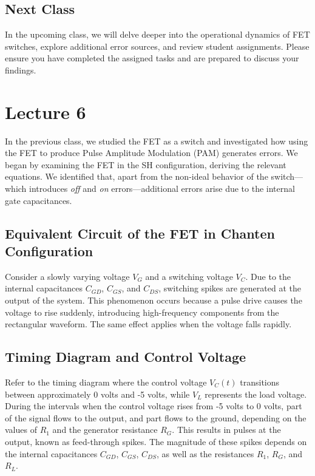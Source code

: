 \subsection*{Next Class}
In the upcoming class, we will delve deeper into the operational dynamics of FET switches, explore additional error sources, and review student assignments. Please ensure you have completed the assigned tasks and are prepared to discuss your findings.

\newpage
\section{Lecture 6}

In the previous class, we studied the FET as a switch and investigated how using the FET to produce Pulse Amplitude Modulation (PAM) generates errors. We began by examining the FET in the SH configuration, deriving the relevant equations. We identified that, apart from the non-ideal behavior of the switch—which introduces \textit{off} and \textit{on} errors—additional errors arise due to the internal gate capacitances.

\subsection{Equivalent Circuit of the FET in Chanten Configuration}

Consider a slowly varying voltage \( V_G \) and a switching voltage \( V_C \). Due to the internal capacitances \( C_{GD} \), \( C_{GS} \), and \( C_{DS} \), switching spikes are generated at the output of the system. This phenomenon occurs because a pulse drive causes the voltage to rise suddenly, introducing high-frequency components from the rectangular waveform. The same effect applies when the voltage falls rapidly.

\subsection{Timing Diagram and Control Voltage}

Refer to the timing diagram where the control voltage \( V_C(t) \) transitions between approximately 0 volts and -5 volts, while \( V_L \) represents the load voltage. During the intervals when the control voltage rises from -5 volts to 0 volts, part of the signal flows to the output, and part flows to the ground, depending on the values of \( R_1 \) and the generator resistance \( R_G \). This results in pulses at the output, known as feed-through spikes. The magnitude of these spikes depends on the internal capacitances \( C_{GD} \), \( C_{GS} \), \( C_{DS} \), as well as the resistances \( R_1 \), \( R_G \), and \( R_L \).

